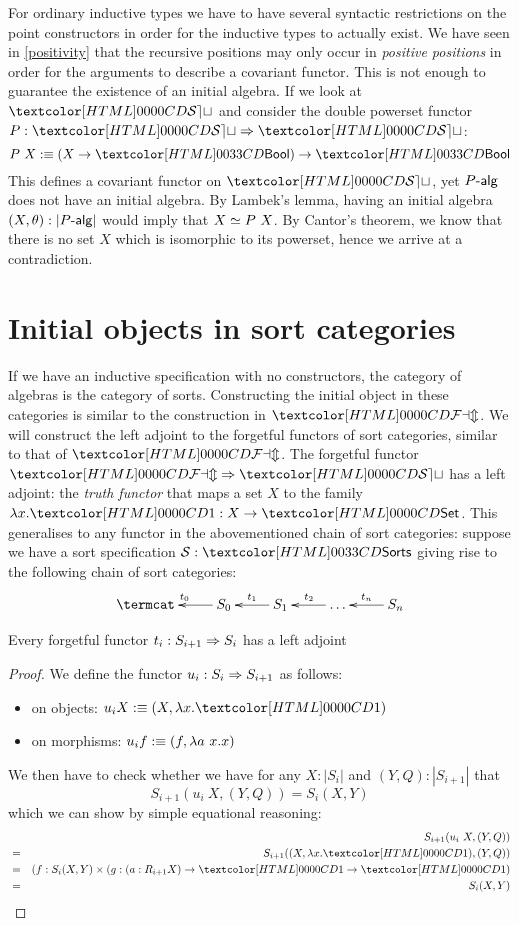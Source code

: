 For ordinary inductive types we have to have several syntactic
restrictions on the point constructors in order for the inductive
types to actually exist. We have seen in
\cref{positivity} that the recursive positions may only
occur in \emph{positive positions} in order for the arguments to
describe a covariant functor. This is not enough to guarantee the
existence of an initial algebra. If we look at $\SET$ and consider the
double powerset functor $P : \Func{\SET}{\SET}$:
$$
P\ X \ddefeq (X \to \boolty) \to \boolty
$$
This defines a covariant functor on $\SET$, yet $\algcat{P}$ does not
have an initial algebra. By Lambek's lemma, having an initial algebra
$(X,\theta) : | \algcat{P} |$ would imply that $X \simeq P\ X$. By
Cantor's theorem, we know that there is no set $X$ which is isomorphic
to its powerset, hence we arrive at a contradiction.

\section{Initial objects in sort categories}

If we have an inductive specification with no constructors, the
category of algebras is the category of sorts. Constructing the
initial object in these categories is similar to the construction in
$\FAM$. We will construct the left adjoint to the forgetful functors
of sort categories, similar to that of $\FAM$. The forgetful functor
$\Func{\FAM}{\SET}$ has a left adjoint: the \emph{truth functor} that
maps a set $X$ to the family $\lambda x . \unitty : X \to \Set$. This
generalises to any functor in the abovementioned chain of sort
categories: suppose we have a sort specification $\Ss : \sortsty$
giving rise to the following chain of sort categories:
$$
\xymatrix{
\termcat &S_0 \ar[l]_{t_0} &S_1 \ar[l]_{t_1} &\hdots \ar[l]_{t_2} &S_n \ar[l]_{t_n}
}
$$

\begin{proposition}
Every forgetful functor $t_i : S_{i+1} \Rightarrow S_i$ has a left adjoint
\end{proposition}

\begin{proof}
  We define the functor $u_i : S_i \Rightarrow S_{i+1}$ as follows:
  \begin{itemize}
  \item on objects: $u_i X \ddefeq (X , \lambda x . \unitty)$
  \item on morphisms: $u_i f :\equiv (f , \lambda a\ x . x)$
  \end{itemize}
  We then have to check whether we have for any $X : | S_i |$ and
  $(Y,Q) : | S_{i+1} |$ that
  $$
  S_{i+1}(u_i\ X , (Y,Q)) = S_i(X,Y)
  $$
  which we can show by simple equational reasoning:
  \begin{align*}
      &&S_{i+1}(u_i\ X , (Y,Q)) \\
    &=& S_{i+1}((X,\lambda x . \unitty), (Y,Q)) \\
    &=& (f : S_i(X,Y) \times (g : (a : R_{i+1} X) \to \unitty \to \unitty) \\
    &=& S_i(X,Y)
  \end{align*}

\end{proof}


